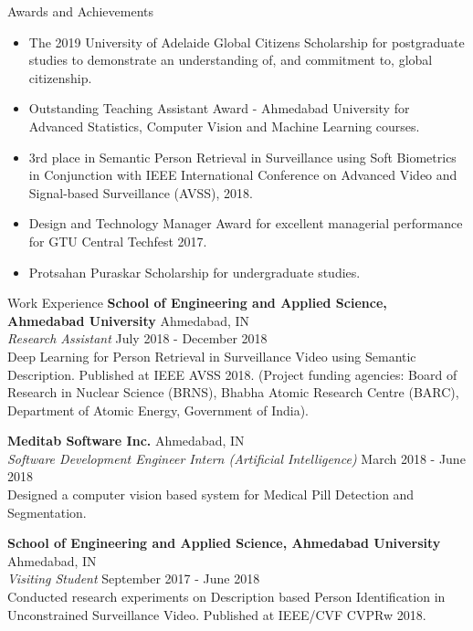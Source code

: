 \documentclass{resume}
\begin{document}
\begin{rSection}{Awards and Achievements}
\begin{itemize}
    \item The 2019 University of Adelaide Global Citizens Scholarship for postgraduate studies to demonstrate an understanding of, and commitment to, global citizenship.
    \item Outstanding Teaching Assistant Award - Ahmedabad University for Advanced
    Statistics, Computer Vision and Machine Learning courses. 
    \item 3rd place in Semantic Person Retrieval in Surveillance using Soft Biometrics in Conjunction with IEEE International Conference on Advanced Video and Signal-based Surveillance (AVSS), 2018.
    \item Design and Technology Manager Award for excellent managerial performance for GTU Central Techfest 2017. 
    \item Protsahan Puraskar Scholarship for undergraduate studies. 
\end{itemize}
\end{rSection}
\begin{rSection}{Work Experience}
{\bf School of Engineering and Applied Science, Ahmedabad University} \hfill {Ahmedabad, IN} \\
\textit{Research Assistant} \hfill{July 2018 - December 2018} \\ 
Deep Learning for Person Retrieval in Surveillance Video using Semantic Description. Published at IEEE AVSS 2018. (Project funding agencies: Board of Research in Nuclear Science (BRNS), Bhabha Atomic Research Centre (BARC), Department of Atomic Energy, Government of India). 

{\bf Meditab Software Inc. } \hfill {Ahmedabad, IN} \\
\textit{Software Development Engineer Intern (Artificial Intelligence)} \hfill{March 2018 - June 2018} \\ 
Designed a computer vision based system for Medical Pill Detection and Segmentation. 

{\bf School of Engineering and Applied Science, Ahmedabad University} \hfill {Ahmedabad, IN} \\
\textit{Visiting Student} \hfill{September 2017 - June 2018} \\ 
Conducted research experiments on Description based Person Identification in Unconstrained Surveillance Video. Published at IEEE/CVF CVPRw 2018.
\end{rSection}
\end{document}
